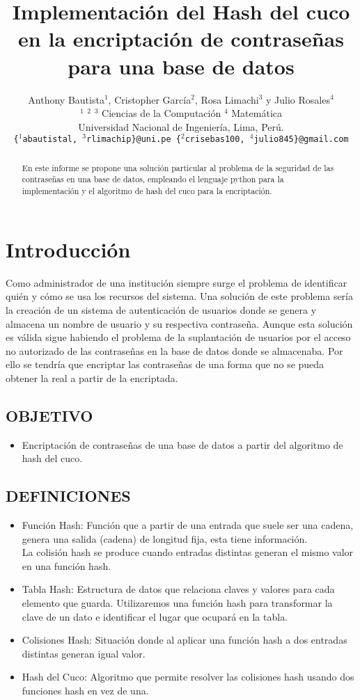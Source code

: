 \documentclass[final,a4paper,twocolumn,romanappendices]{IEEEtran}
\title{Implementación del Hash del cuco en la encriptación de contraseñas para una base de datos }
\author{Anthony Bautista$^{1}$, Cristopher García$^{2}$, Rosa Limachi$^{3}$ y Julio Rosales$^{4}$\\
\small{$^{1}$ $^{2}$ $^{3}$ Ciencias de la Computación $^{4}$ Matemática\\}
\small{Universidad Nacional de Ingeniería, Lima, Perú.\\}
\small{\texttt{\{$^{1}$abautistal, $^{3}$rlimachip\}@uni.pe \{$^{2}$crisebas100, $^{4}$julio845\}@gmail.com}}
}
\begin{document}
\maketitle

\begin{abstract}
 

En este informe se propone una solución particular al problema de la seguridad de las contraseñas en una base de datos, empleando el lenguaje python para la implementación y el algoritmo de hash del cuco para la encriptación. 


\end{abstract}

\section{Introducción}

Como administrador  de una institución siempre surge el problema de identificar quién y cómo se usa los recursos del sistema. Una solución de este problema sería la creación de un sistema de autenticación de usuarios donde se genera y almacena un nombre de usuario y su respectiva contraseña. Aunque esta solución es válida sigue habiendo el problema de la suplantación de usuarios por el acceso no autorizado de las contraseñas en la base de datos donde se almacenaba. Por ello se tendría que encriptar las contraseñas de una forma que no se pueda obtener la real a partir de la encriptada.
%
\subsection{OBJETIVO}
\begin{itemize}
    \item Encriptación de contraseñas de una base de datos a partir del algoritmo de hash del cuco.
\end{itemize}
%
\subsection{DEFINICIONES}
\begin{itemize}
    \item Función Hash: Función que a partir de una entrada que suele ser una cadena, genera una salida (cadena) de longitud fija, esta tiene información.\\
La colisión hash se produce cuando entradas distintas generan el mismo valor en una función hash.
    \item Tabla Hash: Estructura de datos que relaciona claves y valores para cada elemento que guarda. Utilizaremos una función hash para transformar la clave de un dato e identificar el lugar que ocupará en la tabla.
    \item Colisiones Hash: Situación donde al aplicar una función hash a dos entradas distintas generan igual valor.
    \item Hash del Cuco: Algoritmo que permite resolver las colisiones hash usando dos funciones hash en vez de una.
\end{itemize}
\end{document}
